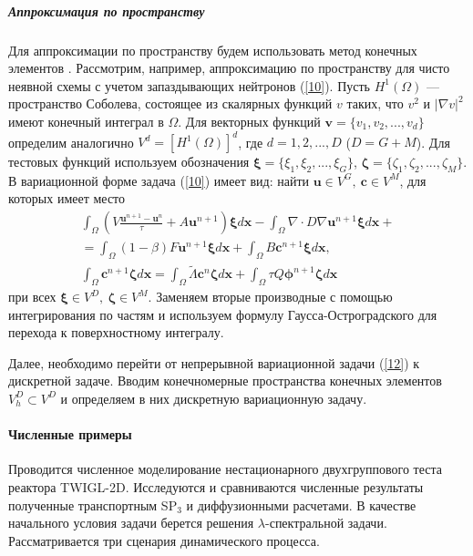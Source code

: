 \documentclass{crm-article}
\begin{document}
\subparagraph{Аппроксимация по пространству}
Для аппроксимации по пространству будем использовать метод конечных элементов \cite{quarteroni2008}. 
Рассмотрим, например, аппроксимацию по пространству для чисто неявной схемы с учетом запаздывающих нейтронов (\ref{10}).
Пусть $H^1(\Omega)$ --- пространство Соболева, состоящее из скалярных функций $v$ таких, что $v^2$ и  $\vert\nabla v\vert^2$ имеют конечный интеграл в $\Omega$. 
Для векторных функций $\bm v = \{v_1, v_2, ..., v_d\}$ определим аналогично $V^d = [H^1(\Omega)]^d$, где $d=1,2,...,D$ ($D=G+M$).
Для тестовых функций используем обозначения $\bm \xi  = \{\xi_1, \xi_2, ..., \xi_G\}$,
$\bm \zeta  = \{\zeta_1, \zeta_2, ..., \zeta_M\}$. 
В вариационной форме задача (\ref{10}) имеет вид: найти $\bm u \in V^G, \ \bm c \in V^M$, для которых имеет место
\begin{equation}\label{12}
\begin{split}
\int_\Omega \left (V \frac{\bm{u}^{n+1}-\bm{u}^n}{\tau} + A
\bm u^{n+1} \right )\bm \xi  d\bm x 
- \int_{\Omega} \nabla\cdot D \nabla\bm{u}^{n+1} \bm \xi d\bm x + \\
= \int_\Omega (1-\beta) F \bm{u}^{n+1} \bm \xi d\bm x + \int_\Omega B\bm c^{n+1}\bm \xi d\bm x,
\\
\int_\Omega \bm{c}^{n+1}\bm \zeta d\bm x = \int_\Omega \widetilde{\Lambda}\bm{c}^{n}\bm \zeta  d\bm x + \int_\Omega \tau Q \bm{\phi}^{n+1}\bm \zeta  d\bm x
\end{split}
\end{equation}
при всех $\bm \xi  \in V^D, \ \bm \zeta  \in V^M$.
Заменяем вторые производные с помощью интегрирования по частям и используем формулу Гаусса-Остроградского для перехода к поверхностному интегралу.

Далее, необходимо перейти от непрерывной вариационной задачи (\ref{12}) к дискретной задаче. 
Вводим конечномерные пространства конечных элементов $V_h^D \subset V^D$ и определяем в них дискретную вариационную задачу.

\paragraph{Численные примеры}
Проводится численное моделирование нестационарного двухгруппового теста реактора TWIGL-2D.
Исследуются и сравниваются численные результаты полученные транспортным SP$_3$ и диффузионными расчетами.
В качестве начального условия задачи берется решения $\lambda$-спектральной задачи. 
Рассматривается три сценария динамического процесса.
\end{document}
